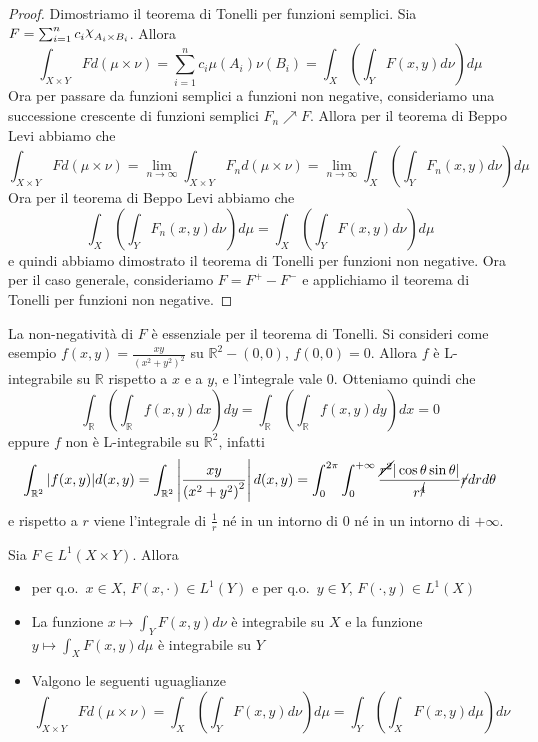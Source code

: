 \begin{proof}
    Dimostriamo il teorema di Tonelli per funzioni semplici. Sia \(F = \sum_{i=1}^{n}
    c_{i} \rchi_{A_{i} \times B_{i}}\). Allora
    \[
        \int_{X \times Y} F d(\mu \times \nu) = \sum_{i=1}^{n} c_{i} \mu(A_{i})
        \nu(B_{i}) = \int_X \left( \int_Y F(x,y) d\nu \right) d\mu
    \]
    Ora per passare da funzioni semplici a funzioni non negative, consideriamo
    una successione crescente di funzioni semplici \(F_{n} \nearrow F\). Allora
    per il teorema di Beppo Levi abbiamo che
    \[
        \int_{X \times Y} F d(\mu \times \nu) = \lim_{n \to \infty} \int_{X
        \times Y} F_{n} d(\mu \times \nu) = \lim_{n \to \infty} \int_X \left(
        \int_Y F_{n}(x,y) d\nu \right) d\mu
    \]
    Ora per il teorema di Beppo Levi abbiamo che
    \[
        \int_X \left( \int_Y F_{n}(x,y) d\nu \right) d\mu = \int_X \left(
        \int_Y F(x,y) d\nu \right) d\mu
    \]
    e quindi abbiamo dimostrato il teorema di Tonelli per funzioni non negative.
    Ora per il caso generale, consideriamo \(F = F^{+} - F^{-}\) e applichiamo
    il teorema di Tonelli per funzioni non negative.
\end{proof}
\begin{remark}
    La non-negatività di \(F\) è essenziale per il teorema di Tonelli. Si
    consideri come esempio \(\displaystyle f(x, y) = \frac{xy}{{\left( x^2+y^2
    \right)}^2}\) su \(\mathbb{R}^2 - (0, 0)\), \(f(0, 0) = 0\). Allora \(f\) è
    L-integrabile su \(\mathbb{R}\) rispetto a \(x\) e a \(y\), e l'integrale
    vale 0. Otteniamo quindi che
    \[
        \int_{\mathbb{R}} \left( \int_{\mathbb{R}} f(x, y) dx \right) dy = 
        \int_{\mathbb{R}} \left( \int_{\mathbb{R}} f(x, y) dy \right) dx = 0 
    \]
    eppure \(f\) non è L-integrabile su \(\mathbb{R}^2\), infatti
    \[
        \int_{\mathbb{R}^2} |f(x, y)| d(x, y) = \int_{\mathbb{R}^2}\left| \frac{xy}{{\left(
        x^2 + y^2 \right)}^2} \right|d(x, y) = \int_{0}^{2\pi} \int_{0}^{+\infty}
        \frac{\cancel{r^2} |\cos \theta \sin \theta|}{r^{\cancel{4}}} \cancel{r}dr d\theta
    \]
    e rispetto a \(r\) viene l'integrale di \(\frac{1}{r}\) né in un intorno di
    \(0\) né in un intorno di \(+\infty\).
\end{remark}
\begin{theorem}[Fubini]
    Sia \(F \in L^{1}(X \times Y)\). Allora 
\begin{itemize}
    \item per q.o.~\(x \in X\), \(F(x, \cdot ) \in L^{1}(Y)\) e per q.o.~\(y \in
        Y\), \(F(\cdot, y) \in L^{1}(X)\)
    \item La funzione \(\displaystyle x \mapsto \int_Y F(x, y) d\nu\) è
        integrabile su \(X\) e la funzione \(\displaystyle y \mapsto \int_X F(x,
        y) d\mu\) è integrabile su \(Y\)
    \item Valgono le seguenti uguaglianze
        \[
            \int_{X \times Y} F d(\mu \times \nu) = \int_X \left( \int_Y F(x,y)
                d\nu \right) d\mu = \int_Y \left( \int_X F(x,y) d\mu \right) d\nu
        \]
\end{itemize}
\end{theorem}
